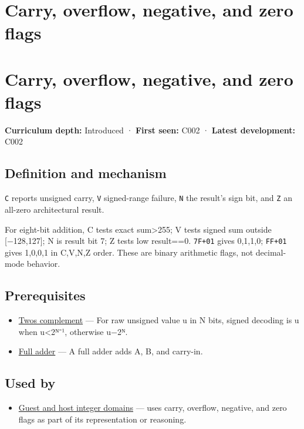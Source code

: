 \hypertarget{appendix-8d687c9c08ab}{}
\section*{Carry, overflow, negative, and zero flags}
\section{Carry, overflow, negative, and zero flags}\label{carry-overflow-negative-and-zero-flags}

\textbf{Curriculum depth:} Introduced · \textbf{First seen:} C002 · \textbf{Latest development:} C002

\subsection{Definition and mechanism}\label{definition-and-mechanism}

\texttt{C} reports unsigned carry, \texttt{V} signed-range failure, \texttt{N} the result's sign bit, and \texttt{Z} an all-zero architectural result.

For eight-bit addition, C tests exact sum\textgreater255; V tests signed sum outside {[}−128,127{]}; N is result bit 7; Z tests low result==0. \texttt{7F+01} gives 0,1,1,0; \texttt{FF+01} gives 1,0,0,1 in C,V,N,Z order. These are binary arithmetic flags, not decimal-mode behavior.

\subsection{Prerequisites}\label{prerequisites}

\begin{itemize}
\tightlist
\item
  \hyperref[appendix-4fbc03d20829]{Two\textquotesingle s complement} --- For raw unsigned value u in N bits, signed decoding is u when u\textless2ᴺ⁻¹, otherwise u−2ᴺ.
\item
  \hyperref[appendix-d1a5b1e520c2]{Full adder} --- A full adder adds A, B, and carry-in.
\end{itemize}

\subsection{Used by}\label{used-by}

\begin{itemize}
\tightlist
\item
  \hyperref[appendix-33e7a011b684]{Guest and host integer domains} --- uses carry, overflow, negative, and zero flags as part of its representation or reasoning.
\end{itemize}

